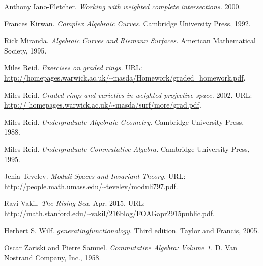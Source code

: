 \documentclass[10pt,notitlepage]{article}
\numberwithin{equation}{subsection}
\begin{document}
\begin{thebibliography}{99}
            Anthony Iano-Fletcher.
            \emph{Working with weighted complete intersections.}
            2000.

            Frances Kirwan.
            \emph{Complex Algebraic Curves.}
            Cambridge University Press, 1992.

            Rick Miranda.
            \emph{Algebraic Curves and Riemann Surfaces.}
            American Mathematical Society, 1995.

            Miles Reid.
            \emph{Exercises on graded rings.}
            {\sc URL}: \href{http://homepages.warwick.ac.uk/~masda/Homework/graded_homework.pdf}{\url{http://homepages.warwick.ac.uk/~masda/Homework/graded_homework.pdf}}.

            Miles Reid.
            \emph{Graded rings and varieties in weighted projective space.}
            2002.
            {\sc URL}: \href{http:// homepages.warwick.ac.uk/~masda/surf/more/grad.pdf}{\url{http:// homepages.warwick.ac.uk/~masda/surf/more/grad.pdf}}.

            Miles Reid.
            \emph{Undergraduate Algebraic Geometry.}
            Cambridge University Press, 1988.

            Miles Reid.
            \emph{Undergraduate Commutative Algebra.}
            Cambridge University Press, 1995.

            Jenia Tevelev.
            \emph{Moduli Spaces and Invariant Theory.}
            {\sc URL}: \href{http://people.math.umass.edu/~tevelev/moduli797.pdf}{\url{http://people.math.umass.edu/~tevelev/moduli797.pdf}}.

            Ravi Vakil.
            \emph{The Rising Sea.}
            Apr. 2015.
            {\sc URL}: \href{http://math.stanford.edu/~vakil/216blog/FOAGapr2915public.pdf}{\url{http://math.stanford.edu/~vakil/216blog/FOAGapr2915public.pdf}}.

            Herbert S. Wilf.
            \emph{generatingfunctionology.}
            Third edition.
            Taylor and Francis, 2005.

            Oscar Zariski and Pierre Samuel.
            \emph{Commutative Algebra: Volume 1.}
            D. Van Nostrand Company, Inc., 1958.

    \end{thebibliography}
\end{document}
